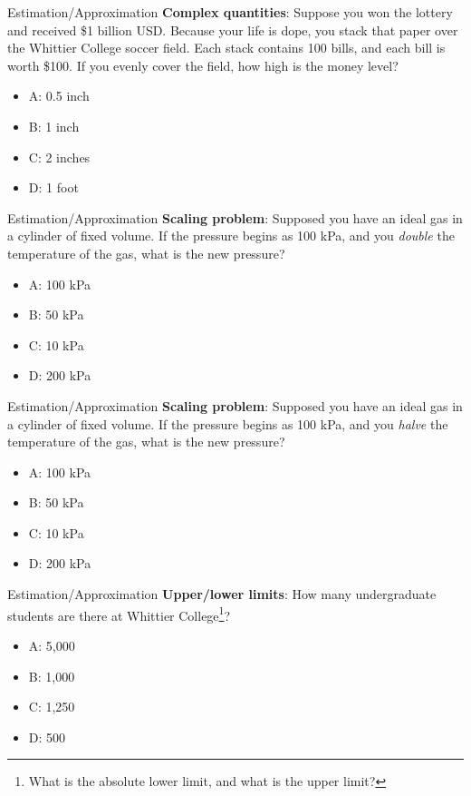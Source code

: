 \documentclass{beamer}
\begin{document}
\begin{frame}{Estimation/Approximation}
\textbf{Complex quantities}: Suppose you won the lottery and received \$1 billion USD.  Because your life is dope, you stack that paper over the Whittier College soccer field.  Each stack contains 100 bills, and each bill is worth \$100.  If you evenly cover the field, how high is the money level?
\begin{itemize}
\item A: 0.5 inch
\item B: 1 inch
\item C: 2 inches
\item D: 1 foot
\end{itemize}
\end{frame}

\begin{frame}{Estimation/Approximation}
\textbf{Scaling problem}: Supposed you have an ideal gas in a cylinder of fixed volume.  If the pressure begins as 100 kPa, and you \textit{double} the temperature of the gas, what is the new pressure?
\begin{itemize}
\item A: 100 kPa
\item B: 50 kPa
\item C: 10 kPa
\item D: 200 kPa
\end{itemize}
\end{frame}

\begin{frame}{Estimation/Approximation}
\textbf{Scaling problem}: Supposed you have an ideal gas in a cylinder of fixed volume.  If the pressure begins as 100 kPa, and you \textit{halve} the temperature of the gas, what is the new pressure?
\begin{itemize}
\item A: 100 kPa
\item B: 50 kPa
\item C: 10 kPa
\item D: 200 kPa
\end{itemize}
\end{frame}

\begin{frame}{Estimation/Approximation}
\textbf{Upper/lower limits}: How many undergraduate students are there at Whittier College\footnote{What is the absolute lower limit, and what is the upper limit?}?
\begin{itemize}
\item A: 5,000
\item B: 1,000
\item C: 1,250
\item D: 500
\end{itemize}
\end{frame}
\end{document}

